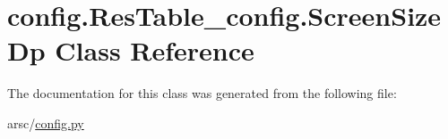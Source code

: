 \hypertarget{classconfig_1_1ResTable__config_1_1ScreenSizeDp}{}\section{config.\+Res\+Table\+\_\+config.\+Screen\+Size\+Dp Class Reference}
\label{classconfig_1_1ResTable__config_1_1ScreenSizeDp}


The documentation for this class was generated from the following file\+:\begin{DoxyCompactItemize}
\item 
arsc/\mbox{\hyperlink{config_8py}{config.\+py}}\end{DoxyCompactItemize}
